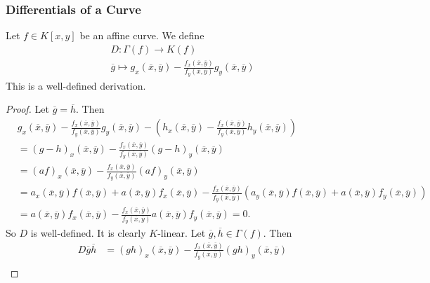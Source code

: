     \subsubsection{Differentials of a Curve}
    \begin{lemma}
        Let $f\in K[x,y]$ be an affine curve. We define
        \begin{gather*}
            D : \Gamma(f) \rightarrow K(f)\\
            \overline{g} \mapsto g_x(\overline{x},\overline{y})-\frac{f_x(\overline{x},\overline{y})}{f_y(\overline{x},\overline{y})}g_y(\overline{x},\overline{y})
        \end{gather*}
        This is a well-defined derivation. 
    \end{lemma}
    \begin{proof}
        Let $\overline{g} = \overline{h}$. Then 
        \begin{align*}
            &g_x(\overline{x},\overline{y})-\frac{f_x(\overline{x},\overline{y})}{f_y(\overline{x},\overline{y})}g_y(\overline{x},\overline{y}) - \left(h_x(\overline{x},\overline{y})-\frac{f_x(\overline{x},\overline{y})}{f_y(\overline{x},\overline{y})}h_y(\overline{x},\overline{y})\right) \\
            &= (g-h)_x(\overline{x},\overline{y})-\frac{f_x(\overline{x},\overline{y})}{f_y(\overline{x},\overline{y})}(g-h)_y(\overline{x},\overline{y})\\
            &= (af)_x(\overline{x},\overline{y})-\frac{f_x(\overline{x},\overline{y})}{f_y(\overline{x},\overline{y})}(af)_y(\overline{x},\overline{y})\\
            &= a_x(\overline{x},\overline{y})f(\overline{x},\overline{y})+a(\overline{x},\overline{y})f_x(\overline{x},\overline{y})-\frac{f_x(\overline{x},\overline{y})}{f_y(\overline{x},\overline{y})}(a_y(\overline{x},\overline{y})f(\overline{x},\overline{y})+a(\overline{x},\overline{y})f_y(\overline{x},\overline{y}))\\
            &= a(\overline{x},\overline{y})f_x(\overline{x},\overline{y})-\frac{f_x(\overline{x},\overline{y})}{f_y(\overline{x},\overline{y})}a(\overline{x},\overline{y})f_y(\overline{x},\overline{y}) = 0.
        \end{align*}
        So $D$ is well-defined. It is clearly $K$-linear. Let $\overline{g},\overline{h}\in \Gamma(f)$. Then 
        \begin{align*}
            D\overline{g}\overline{h} &= (gh)_x(\overline{x},\overline{y})-\frac{f_x(\overline{x},\overline{y})}{f_y(\overline{x},\overline{y})}(gh)_y(\overline{x},\overline{y}) \\

\end{align*}
\end{proof}
